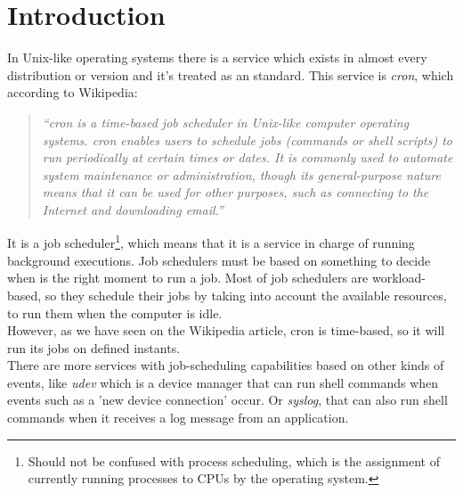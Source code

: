 \documentclass[a4paper,11pt]{article}
\begin{document}
\section{Introduction}
In Unix-like operating systems there is a service which exists in almost every 
distribution or version and it's treated as an standard. This service is 
\emph{cron}, which according to Wikipedia:
\begin{quote}
  \emph{
    ``cron is a time-based job scheduler in Unix-like computer operating systems. cron 
    enables users to schedule jobs (commands or shell scripts) to run periodically at 
    certain times or dates. It is commonly used to automate system maintenance or 
    administration, though its general-purpose nature means that it can be used for other 
    purposes, such as connecting to the Internet and downloading email.''
  }
\end{quote}
It is a job scheduler\footnote{Should not be confused with process scheduling, which is 
the assignment of currently running processes to CPUs by the operating system.}, 
which means that it is a service in charge of running background 
executions. Job schedulers must be based on something to decide when is the right moment
to run a job. Most of job schedulers are workload-based, so they schedule their jobs by
taking into account the available resources, to run them when the computer is idle.\\
However, as we have seen on the Wikipedia article, cron is time-based, so it will run its 
jobs on defined instants.\\
There are more services with job-scheduling capabilities based on other kinds of events,
like \emph{udev} which is a device manager that can run shell commands when events such as a 'new
device connection' occur. Or \emph{syslog}, that can also run shell commands when it receives a
log message from an application.
\end{document}
